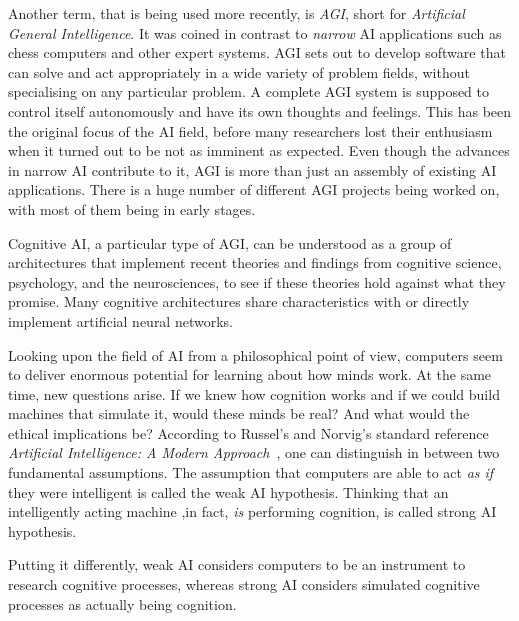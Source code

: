 
Another term, that is being used more recently, is \emph{AGI}, short for \emph{Artificial General Intelligence}. It was coined in contrast to \emph{narrow} AI applications such as chess computers and other expert systems. AGI sets out to develop software that can solve and act appropriately in a wide variety of problem fields, without specialising on any particular problem. A complete AGI system is supposed to control itself autonomously and have its own thoughts and feelings. This has been the original focus of the AI field, before many researchers lost their enthusiasm when it turned out to be not as imminent as expected. Even though the advances in narrow AI contribute to it, AGI is more than just an assembly of existing AI applications. There is a huge number of different AGI projects being worked on, with most of them being in early stages.~\cite{goertzel2007artificial} %



Cognitive AI, a particular type of AGI, can be understood as a group of architectures that implement recent theories and findings from cognitive science, psychology, and the neurosciences, to see if these theories hold against what they promise. Many cognitive architectures share characteristics with or directly implement artificial neural networks.


Looking upon the field of AI from a philosophical point of view, computers seem to deliver enormous potential for learning about how minds work. At the same time, new questions arise. If we knew how cognition works and if we could build machines that simulate it, would these minds be real? And what would the ethical implications be? According to Russel's and Norvig's standard reference \emph{Artificial Intelligence: A Modern Approach}~\cite{russell2009artificial}, one can distinguish in between two fundamental assumptions. The assumption that computers are able to act \emph{as if} they were intelligent is called the weak AI hypothesis. Thinking that an intelligently acting machine ,in fact, \emph{is} performing cognition, is called strong AI hypothesis.

Putting it differently, weak AI considers computers to be an instrument to research cognitive processes, whereas strong AI considers simulated cognitive processes as actually being cognition.

